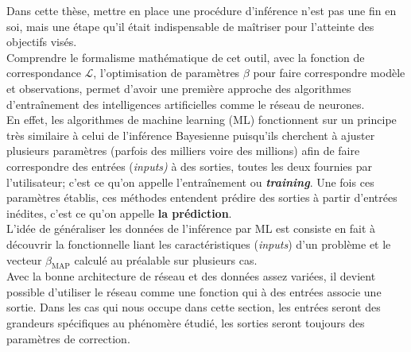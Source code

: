\documentclass[a4paper,12pt]{article}
\newcommand{\bmap}{\beta_{\text{MAP}}}
\numberwithin{equation}{section} %
\begin{document}
\noindent Dans cette thèse, mettre en place une procédure d'inférence n'est pas une fin en soi, mais une étape qu'il était indispensable de maîtriser pour l'atteinte des objectifs visés.\\
Comprendre le formalisme mathématique de cet outil, avec la fonction de correspondance $\mathcal{L}$, l'optimisation de paramètres $\beta$ pour faire correspondre modèle et observations, permet d'avoir une première approche des algorithmes d'entraînement des intelligences artificielles comme le réseau de neurones.\\
En effet, les algorithmes de machine learning (ML) fonctionnent sur un principe très similaire à celui de l'inférence Bayesienne puisqu'ils cherchent à ajuster plusieurs paramètres (parfois des milliers voire des millions) afin de faire correspondre des entrées (\textit{inputs)} à des sorties, toutes les deux fournies par l'utilisateur; c'est ce qu'on appelle l'entraînement ou \textbf{\textit{training}}. Une fois ces paramètres établis, ces méthodes entendent prédire des sorties à partir d'entrées inédites, c'est ce qu'on appelle \textbf{la prédiction}.\\

\noindent L'idée de généraliser les données de l'inférence par ML est consiste en fait à découvrir la fonctionnelle liant les caractéristiques (\textit{inputs}) d'un problème et le vecteur $\bmap$ calculé au préalable sur plusieurs cas.\\
Avec la bonne architecture de réseau et des données assez variées, il devient possible d'utiliser le réseau comme une fonction qui à des entrées associe une sortie. Dans les cas qui nous occupe dans cette section, les entrées seront des grandeurs spécifiques au phénomère étudié, les sorties seront toujours des paramètres de correction.
\end{document}
